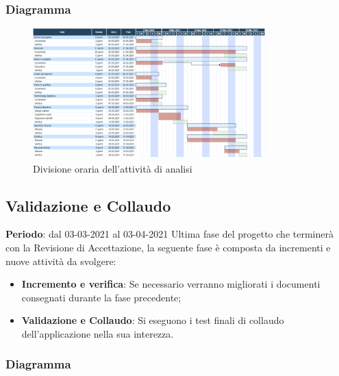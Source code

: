 	\subsubsection{Diagramma}
		\begin{figure}[H]
        		\centering
        		\includegraphics[width=0.8\textwidth]{source/img/Progettazionedettaglio_codifica.png}
        		\caption{Divisione oraria dell'attività di analisi}
    		\end{figure}

	\subsection{Validazione e Collaudo}
	\textbf{Periodo}: dal 03-03-2021 al 03-04-2021
	Ultima fase del progetto che terminerà con la Revisione di Accettazione, la seguente fase è composta da incrementi e nuove attività da svolgere:
	\begin{itemize}
		\item \textbf{Incremento e verifica}: Se necessario verranno migliorati i documenti consegnati durante la fase precedente;
		\item \textbf{Validazione e Collaudo}: Si eseguono i test finali di collaudo dell'applicazione nella sua interezza.
	\end{itemize}
	
	\subsubsection{Diagramma}